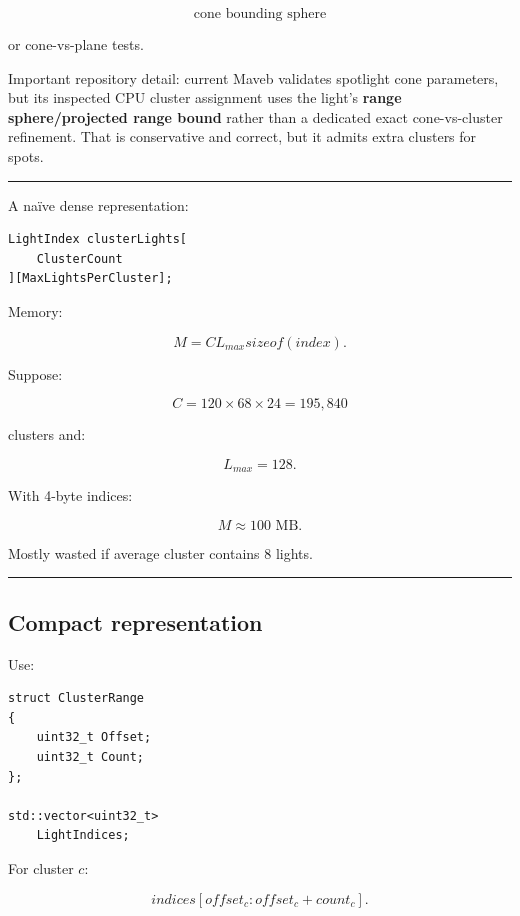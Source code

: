 \[
\text{cone bounding sphere}
\]

or cone-vs-plane tests.

Important repository detail: current Maveb validates spotlight cone parameters, but its inspected CPU cluster assignment uses the light's \textbf{range sphere/projected range bound} rather than a dedicated exact cone-vs-cluster refinement. That is conservative and correct, but it admits extra clusters for spots.

\begin{center}\rule{0.5\linewidth}{0.5pt}\end{center}

A naïve dense representation:

\begin{verbatim}
LightIndex clusterLights[
    ClusterCount
][MaxLightsPerCluster];
\end{verbatim}

Memory:

\[
M=
C
L_{max}
sizeof(index).
\]

Suppose:

\[
C=120\times68\times24
=
195,840
\]

clusters and:

\[
L_{max}=128.
\]

With 4-byte indices:

\[
M\approx100\text{ MB}.
\]

Mostly wasted if average cluster contains 8 lights.

\begin{center}\rule{0.5\linewidth}{0.5pt}\end{center}

\subsection{Compact representation}\label{04-visual-computing-ii-ch040-compact-representation}

\hypertarget{04-visual-computing-ii-ch040-compact-representation}{}

Use:

\begin{verbatim}
struct ClusterRange
{
    uint32_t Offset;
    uint32_t Count;
};

std::vector<uint32_t>
    LightIndices;
\end{verbatim}

For cluster \(c\):

\[
indices[
offset_c:
offset_c+count_c
].
\]

